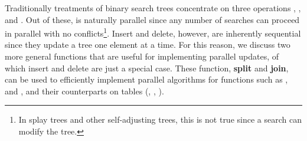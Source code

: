 Traditionally treatments of binary search trees concentrate on three
operations , , and .  Out of
these,  is naturally parallel since any number of searches
can proceed in parallel with no conflicts\footnote{In splay trees and
  other self-adjusting trees, this is not true since a search can
  modify the tree.}. Insert and delete, however, are inherently
sequential since they update a tree one element at a time.  For this
reason, we discuss two more general functions that are useful for
implementing parallel updates, of which insert and delete are just a
special case.  These function, \textbf{split} and \textbf{join}, can be used to
efficiently implement parallel algorithms for functions such as
,  and , and their
counterparts on tables (, ,
).  

\begin{comment}
We are interested in two functions, called \cname{split}
and \cname{join}, with the following types:
\begin{lstlisting}[numbers=none]
  split$(T,k)$ : BST ** $\kkk$ -> BST ** $\bbb$ ** BST@\vspace{.1in}@
  join$(T_1,m,T_2)$ : BST ** ($\kkk$ option) ** BST -> BST 
\end{lstlisting}
where $\bbb$, as usual, indicates a Boolean.
\end{comment}

